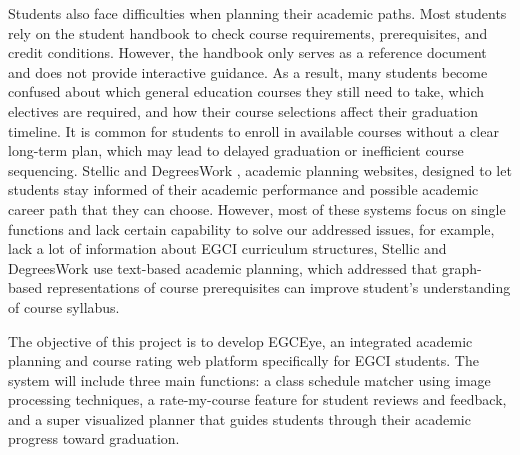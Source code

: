 \hspace{1.6 cm}Students also face difficulties when planning their academic paths. Most students rely on the student handbook to check course requirements, prerequisites, and credit conditions. However, the handbook only serves as a reference document and does not provide interactive guidance. As a result, many students become confused about which general education courses they still need to take, which electives are required, and how their course selections affect their graduation timeline. It is common for students to enroll in available courses without a clear long-term plan, which may lead to delayed graduation or inefficient course sequencing. Stellic and DegreesWork \cite{stellic} \cite{degreeworks}, academic planning websites, designed to let students stay informed of their academic performance and possible academic career path that they can choose.  However, most of these systems focus on single functions and lack certain capability to solve our addressed issues, for example, \cite{ratemyprofessors} lack a lot of information about EGCI curriculum structures, Stellic and DegreesWork \cite{stellic} \cite{degreeworks} use text-based academic planning, which \cite{trippel2025developing} addressed that graph-based representations of course prerequisites can improve student’s understanding of course syllabus.

\hspace{1.6 cm}The objective of this project is to develop EGCEye, an integrated academic planning and course rating web platform specifically for EGCI students. The system will include three main functions: a class schedule matcher using image processing techniques, a rate-my-course feature for student reviews and feedback, and a super visualized planner that guides students through their academic progress toward graduation.



